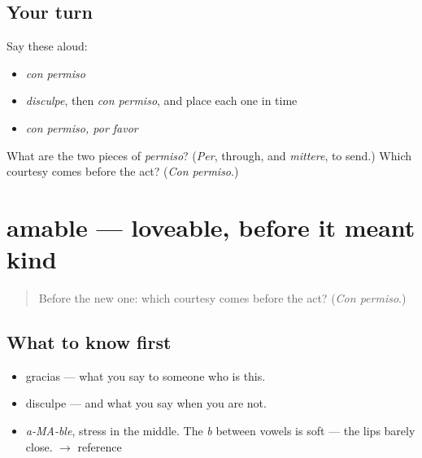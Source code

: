\subsection*{Your turn}
Say these aloud:

\begin{itemize}
\raggedright
  \item \emph{con permiso}
  \item \emph{disculpe}, then \emph{con permiso}, and place each one in time
  \item \emph{con permiso, por favor}
\end{itemize}

\begin{tcolorbox}[breakable,colback=teal!4,colframe=teal!35!black,title={Before you move on}]
What are the two pieces of \emph{permiso}? (\emph{Per}, through, and \emph{mittere}, to send.) Which courtesy comes before the act? (\emph{Con permiso}.)
\end{tcolorbox}
\section[amable]{amable — loveable, before it meant kind}

\label{lesson:ES-C283-amable}



\begin{quote}
Before the new one: which courtesy comes before the act? (\emph{Con permiso}.)
\end{quote}

\subsection*{What to know first}
\begin{itemize}
\raggedright
  \item gracias — what you say to someone who is this.
  \item disculpe — and what you say when you are not.
\end{itemize}

\begin{sounds}
\begin{itemize}
\raggedright
  \item \emph{a-MA-ble}, stress in the middle. The \emph{b} between vowels is soft — the lips barely close. $\to$ reference
\end{itemize}
\end{sounds}

